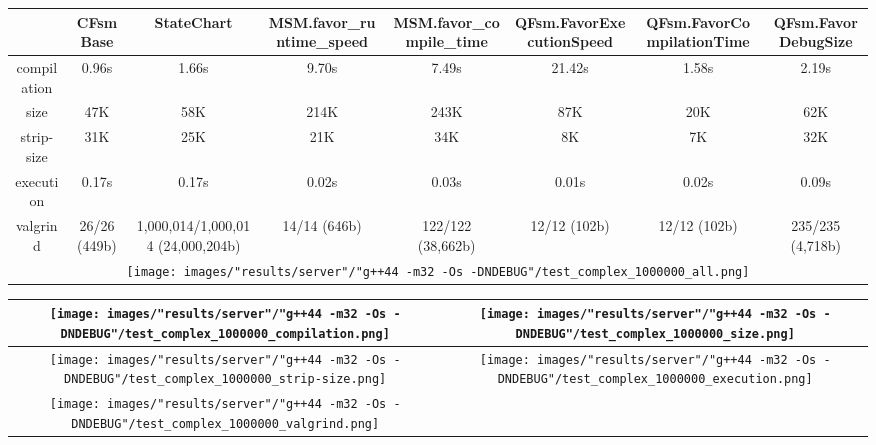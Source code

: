 \begin{landscape}
\begin{table}
\caption{"server" [54c084f], g++44 -m32 -Os -DNDEBUG/test complex 1000000}
\centering
\begin{longtable}{| c | c |c |c |c |c |c |c |}
\hline
& CFsmBase& StateChart& MSM.favor\_runtime\_speed& MSM.favor\_compile\_time& QFsm.FavorExecutionSpeed& QFsm.FavorCompilationTime& QFsm.FavorDebugSize\\
\hline
compilation & 0.96s & 1.66s & 9.70s & 7.49s & 21.42s & 1.58s & 2.19s\\
\hline
size & 47K & 58K & 214K & 243K & 87K & 20K & 62K\\
\hline
strip-size & 31K & 25K & 21K & 34K & 8K & 7K & 32K\\
\hline
execution & 0.17s & 0.17s & 0.02s & 0.03s & 0.01s & 0.02s & 0.09s\\
\hline
valgrind & 26/26 (449b) & 1,000,014/1,000,014 (24,000,204b) & 14/14 (646b) & 122/122 (38,662b) & 12/12 (102b) & 12/12 (102b) & 235/235 (4,718b)\\
\hline
\multicolumn{8}{|c|}{\texttt{[image: images/"results/server"/"g++44 -m32 -Os -DNDEBUG"/test\_complex\_1000000\_all.png]}}\\
\hline
\end{longtable}
\end{table}
\end{landscape}
\newpage
\begin{table}
\centering
\begin{longtable}{| c | c |}
\hline
\texttt{[image: images/"results/server"/"g++44 -m32 -Os -DNDEBUG"/test\_complex\_1000000\_compilation.png]}& \texttt{[image: images/"results/server"/"g++44 -m32 -Os -DNDEBUG"/test\_complex\_1000000\_size.png]}\\
\hline
\texttt{[image: images/"results/server"/"g++44 -m32 -Os -DNDEBUG"/test\_complex\_1000000\_strip-size.png]}& \texttt{[image: images/"results/server"/"g++44 -m32 -Os -DNDEBUG"/test\_complex\_1000000\_execution.png]}\\
\hline
\texttt{[image: images/"results/server"/"g++44 -m32 -Os -DNDEBUG"/test\_complex\_1000000\_valgrind.png]}& \\ \hline
\end{longtable}
\end{table}
